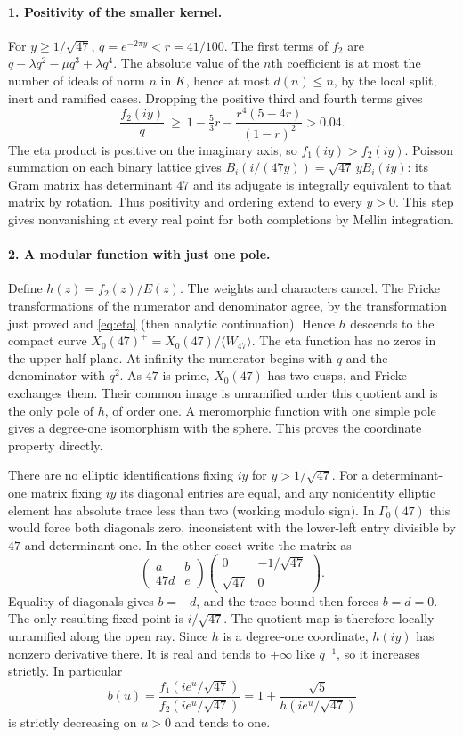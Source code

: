 \paragraph{1. Positivity of the smaller kernel.}
For $y\ge1/\sqrt{47}$, $q=e^{-2\pi y}<r=41/100$. The first terms of $f_2$ are $q-\lambda q^2-\mu q^3+\lambda q^4$. The absolute value of the $n$th coefficient is at most the number of ideals of norm $n$ in $K$, hence at most $d(n)\le n$, by the local split, inert and ramified cases. Dropping the positive third and fourth terms gives
\[
 \frac{f_2(iy)}q\ \ge\ 1-\tfrac53r-
 \frac{r^4(5-4r)}{(1-r)^2}>0.04.
\]
The eta product is positive on the imaginary axis, so $f_1(iy)>f_2(iy)$. Poisson summation on each binary lattice gives $B_i(i/(47y))=\sqrt{47}\,y B_i(iy)$: its Gram matrix has determinant $47$ and its adjugate is integrally equivalent to that matrix by rotation. Thus positivity and ordering extend to every $y>0$. This step gives nonvanishing at every real point for both completions by Mellin integration.

\paragraph{2. A modular function with just one pole.}
Define $h(z)=f_2(z)/E(z)$. The weights and characters cancel.
The Fricke transformations of the numerator and denominator agree, by the transformation just proved and \eqref{eq:eta} (then analytic continuation).
Hence $h$ descends to the compact curve $X_0(47)^+=X_0(47)/\langle W_{47}\rangle$. The eta function has no zeros in the upper half-plane. At infinity the numerator begins with $q$ and the denominator with $q^2$. As $47$ is prime, $X_0(47)$ has two cusps, and Fricke exchanges them. Their common image is unramified under this quotient and is the only pole of $h$, of order one. A meromorphic function with one simple pole gives a degree-one isomorphism with the sphere. This proves the coordinate property directly.

There are no elliptic identifications fixing $iy$ for $y>1/\sqrt{47}$. For a determinant-one matrix fixing $iy$ its diagonal entries are equal, and any nonidentity elliptic element has absolute trace less than two (working modulo sign). In $\Gamma_0(47)$ this would force both diagonals zero, inconsistent with the lower-left entry divisible by $47$ and determinant one. In the other coset write the matrix as
\[
 \begin{pmatrix}a&b\\47d&e\end{pmatrix}
 \begin{pmatrix}0&-1/\sqrt{47}\\\sqrt{47}&0\end{pmatrix}.
\]
Equality of diagonals gives $b=-d$, and the trace bound then forces $b=d=0$. The only resulting fixed point is $i/\sqrt{47}$. The quotient map is therefore locally unramified along the open ray. Since $h$ is a degree-one coordinate, $h(iy)$ has nonzero derivative there. It is real and tends to $+\infty$ like $q^{-1}$, so it increases strictly. In particular
\[
 b(u)=\frac{f_1(ie^u/\sqrt{47})}{f_2(ie^u/\sqrt{47})}
 =1+\frac{\sqrt5}{h(ie^u/\sqrt{47})}
\]
is strictly decreasing on $u>0$ and tends to one.

